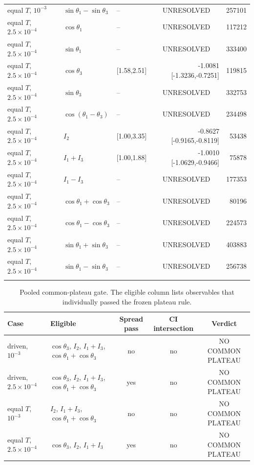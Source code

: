 \begin{longtable}{lllrr}
equal $T$, $10^{-3}$ & $\sin\theta_1-\sin\theta_3$ & -- & \multicolumn{1}{c}{UNRESOLVED} & 257101 \\
\addlinespace
equal $T$, $2.5\!\times\!10^{-4}$ & $\cos\theta_1$ & -- & \multicolumn{1}{c}{UNRESOLVED} & 117212 \\
equal $T$, $2.5\!\times\!10^{-4}$ & $\sin\theta_1$ & -- & \multicolumn{1}{c}{UNRESOLVED} & 333400 \\
equal $T$, $2.5\!\times\!10^{-4}$ & $\cos\theta_3$ & [1.58,2.51] & -1.0081 [-1.3236,-0.7251] & 119815 \\
equal $T$, $2.5\!\times\!10^{-4}$ & $\sin\theta_3$ & -- & \multicolumn{1}{c}{UNRESOLVED} & 332753 \\
equal $T$, $2.5\!\times\!10^{-4}$ & $\cos(\theta_1-\theta_3)$ & -- & \multicolumn{1}{c}{UNRESOLVED} & 234498 \\
equal $T$, $2.5\!\times\!10^{-4}$ & $I_2$ & [1.00,3.35] & -0.8627 [-0.9165,-0.8119] & 53438 \\
equal $T$, $2.5\!\times\!10^{-4}$ & $I_1+I_3$ & [1.00,1.88] & -1.0010 [-1.0629,-0.9466] & 75878 \\
equal $T$, $2.5\!\times\!10^{-4}$ & $I_1-I_3$ & -- & \multicolumn{1}{c}{UNRESOLVED} & 177353 \\
equal $T$, $2.5\!\times\!10^{-4}$ & $\cos\theta_1+\cos\theta_3$ & -- & \multicolumn{1}{c}{UNRESOLVED} & 80196 \\
equal $T$, $2.5\!\times\!10^{-4}$ & $\cos\theta_1-\cos\theta_3$ & -- & \multicolumn{1}{c}{UNRESOLVED} & 224573 \\
equal $T$, $2.5\!\times\!10^{-4}$ & $\sin\theta_1+\sin\theta_3$ & -- & \multicolumn{1}{c}{UNRESOLVED} & 403883 \\
equal $T$, $2.5\!\times\!10^{-4}$ & $\sin\theta_1-\sin\theta_3$ & -- & \multicolumn{1}{c}{UNRESOLVED} & 256738 \\
\addlinespace
\bottomrule\end{longtable}
\begin{table}[t]\centering\small
\caption{Pooled common-plateau gate.  The eligible column lists observables that individually passed the frozen plateau rule.}\label{tab:common}
\begin{tabular}{lp{4.1cm}ccc}\toprule Case & Eligible & Spread pass & CI intersection & Verdict\\\midrule
driven, $10^{-3}$ & $\cos\theta_3$, $I_2$, $I_1+I_3$, $\cos\theta_1+\cos\theta_3$ & no & no & NO COMMON PLATEAU \\
driven, $2.5\!\times\!10^{-4}$ & $\cos\theta_3$, $I_2$, $I_1+I_3$, $\cos\theta_1+\cos\theta_3$ & yes & no & NO COMMON PLATEAU \\
equal $T$, $10^{-3}$ & $I_2$, $I_1+I_3$, $\cos\theta_1+\cos\theta_3$ & no & no & NO COMMON PLATEAU \\
equal $T$, $2.5\!\times\!10^{-4}$ & $\cos\theta_3$, $I_2$, $I_1+I_3$ & yes & no & NO COMMON PLATEAU \\
\bottomrule\end{tabular}\end{table}
